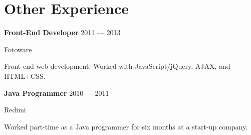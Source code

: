 \section{Other Experience}
\parbox[t][][t]{\linewidth}{
	\parbox{\linewidth}{\textbf{Front-End Developer} \hfill {{2011 --- 2013}}}
	\parbox{\linewidth}{Fotoware}
	\smallbreak
	\smallskip
	Front-end web development. Worked with
	JavaScript/jQuery, AJAX, and HTML+CSS.
	\bigbreak
	\smallskip
}

\parbox[t][][t]{\linewidth}{
	\parbox{\linewidth}{\textbf{Java Programmer} \hfill {{2010 --- 2011}}}
	\parbox{\linewidth}{Redimi}
	\smallbreak
	\smallskip
	Worked part-time as a Java programmer for six months at a start-up company.
	\bigbreak
	\smallskip
}

%


